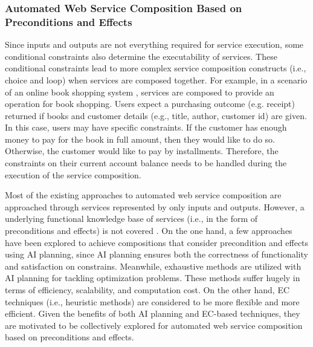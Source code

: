 \subsubsection{Automated Web Service Composition Based on Preconditions and Effects}
Since inputs and outputs are not everything required for service execution, some conditional constraints also determine the executability of services. These conditional constraints lead to more complex service composition constructs (i.e., choice and loop) when services are composed together. For example, in a scenario of an online book shopping system \cite{wang2014automated}, services are composed to provide an operation for book shopping.  Users expect a purchasing outcome (e.g. receipt) returned if books and customer details (e.g., title, author, customer id) are given. In this case, users may have specific constraints. If the customer has enough money to pay for the book in full amount, then they would like to do so. Otherwise, the customer would like to pay by installments. Therefore, the constraints on their current account balance needs to be handled during the execution of the service composition.

Most of the existing approaches to automated web service composition are approached through services represented by only inputs and outputs. However, a underlying functional knowledge base of services (i.e., in the form of preconditions and effects) is not covered \cite{paliwal2012semantics}. On the one hand, a few approaches \cite{bansal2016generalized,DBLP:journals/soca/BoustilMS14} have been explored to achieve compositions that consider precondition and effects using AI planning, since AI planning ensures both the correctness of functionality and satisfaction on constrains. Meanwhile, exhaustive methods are utilized with AI planning for tackling optimization problems. These methods suffer hugely in terms of efficiency, scalability, and computation cost. On the other hand, EC techniques (i.e., heuristic methods) are considered to be more flexible and more efficient. Given the benefits of both AI planning and EC-based techniques, they are motivated to be collectively explored for automated web service composition based on preconditions and effects.
 
